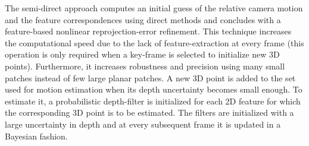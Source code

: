 

The semi-direct approach computes an initial guess of the relative camera motion and the feature correspondences using direct methods and concludes with a feature-based nonlinear reprojection-error refinement. This technique increases the computational speed due to the lack of feature-extraction at every frame (this operation is only required when a key-frame is selected to initialize new 3D points). Furthermore, it increases robustness and precision using many small patches instead of few large planar patches.
A new 3D point is added to the set used for motion estimation when its depth uncertainty becomes small enough. To estimate it, a probabilistic depth-filter is initialized for each 2D feature for which the corresponding 3D point is to be estimated. The filters are initialized with a large uncertainty in depth and at every subsequent frame it is updated in a Bayesian fashion.



